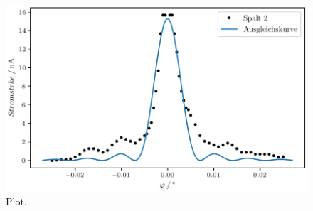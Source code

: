 
\begin{figure}
  \centering
  \includegraphics{plot1.pdf}
  \caption{Plot.}
  \label{fig:plot}
\end{figure}

